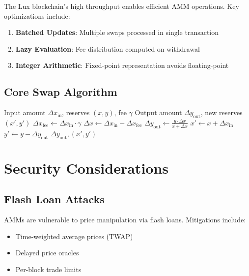 \documentclass[11pt,a4paper]{article}
\theoremstyle{definition}
\begin{document}
The Lux blockchain's high throughput enables efficient AMM operations. Key optimizations include:

\begin{enumerate}
\item \textbf{Batched Updates}: Multiple swaps processed in single transaction
\item \textbf{Lazy Evaluation}: Fee distribution computed on withdrawal
\item \textbf{Integer Arithmetic}: Fixed-point representation avoids floating-point
\end{enumerate}

\subsection{Core Swap Algorithm}

\begin{algorithm}
\caption{Constant Product Swap}
\begin{algorithmic}[1]
\Require Input amount $\Delta x_{\text{in}}$, reserves $(x, y)$, fee $\gamma$
\Ensure Output amount $\Delta y_{\text{out}}$, new reserves $(x', y')$
\State $\Delta x_{\text{fee}} \gets \Delta x_{\text{in}} \cdot \gamma$
\State $\Delta x \gets \Delta x_{\text{in}} - \Delta x_{\text{fee}}$
\State $\Delta y_{\text{out}} \gets \frac{y \cdot \Delta x}{x + \Delta x}$
\State $x' \gets x + \Delta x_{\text{in}}$
\State $y' \gets y - \Delta y_{\text{out}}$
\State \Return $\Delta y_{\text{out}}, (x', y')$
\end{algorithmic}
\end{algorithm}

\section{Security Considerations}

\subsection{Flash Loan Attacks}

AMMs are vulnerable to price manipulation via flash loans. Mitigations include:
\begin{itemize}
\item Time-weighted average prices (TWAP)
\item Delayed price oracles
\item Per-block trade limits
\end{itemize}
\end{document}
